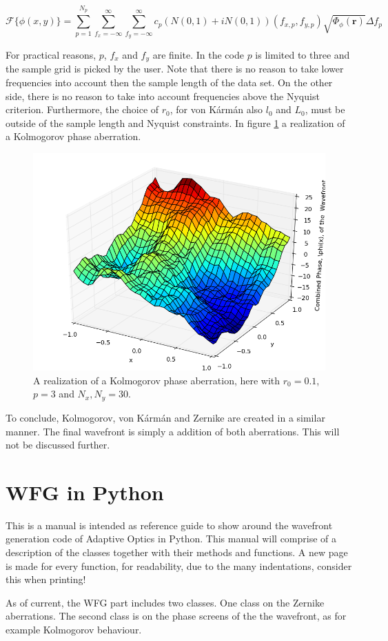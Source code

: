 \documentclass{article}
\begin{document}
\begin{equation}
\mathcal{F}\{\phi(x,y)\} = \sum \limits_{p=1}^{N_p} \sum \limits_{f_x=-\infty}^\infty \sum \limits_{f_y=-\infty}^\infty c_p \left( N(0,1) + i N(0,1) \right)(f_{x,p},f_{y,p}) \sqrt{\Phi_{\phi}(\textbf{r})} \Delta f_p
\label{eq_wfg54}
\end{equation}

For practical reasons, $p$, $f_x$ and $f_y$ are finite. In the code $p$ is limited to three and the sample grid is picked by the user. Note that there is no reason to take lower frequencies into account then the sample length of the data set. On the other side, there is no reason to take into account frequencies above the Nyquist criterion. Furthermore, the choice of $r_0$, for von K{\'a}rm{\'a}n also $l_0$ and $L_0$, must be outside of the sample length and Nyquist constraints. In figure \ref{fig_wfg05} a realization of a Kolmogorov phase aberration.

\begin{figure}[H]
	\center
	\includegraphics[height=0.5\textwidth, height=.3\textwidth]{Figures/kolmogorov.png}
	\caption{A realization of a Kolmogorov phase aberration, here with $r_0 = 0.1$, $p=3$ and $N_x,N_y = 30$.}
	\label{fig_wfg05}
\end{figure}

To conclude, Kolmogorov, von K{\'a}rm{\'a}n and Zernike are created in a similar manner. The final wavefront is simply a addition of both aberrations. This will not be discussed further.

\newpage
\section{WFG in Python}
This is a manual is intended as reference guide to show around the wavefront generation code of Adaptive Optics in Python. This manual will comprise of a description of the classes together with their methods and functions. A new page is made for every function, for readability, due to the many indentations, consider this when printing!

As of current, the WFG part includes two classes. One class on the Zernike aberrations. The second class is on the phase screens of the the wavefront, as for example Kolmogorov behaviour.
\end{document}
